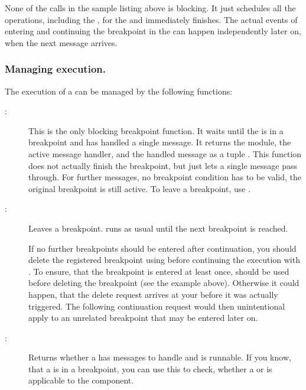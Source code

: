 None of the calls in the sample listing above is blocking. It just schedules
all the operations, including the , for the
 and immediately finishes. The actual events of
entering and continuing the breakpoint in the  can
happen independently later on, when the next  message arrives.

\subsubsection{Managing execution.}

The execution of a  can be managed by the
following functions:

\begin{description}
\item[:] This is the only blocking
  breakpoint function. It waits until the  is in a
  breakpoint and has handled a single message.  It returns the module, the
  active message handler, and the handled message as a tuple .  This function does not actually finish the breakpoint,
  but just lets a single message pass through. For further messages, no
  breakpoint condition has to be valid, the original breakpoint is still
  active. To leave a breakpoint, use .

\item[:]
  Leaves a breakpoint.  runs as usual until the
  next breakpoint is reached.

  If no further breakpoints should be entered after continuation, you should
  delete the registered breakpoint using 
  before continuing the execution with
  . To ensure, that the breakpoint is
  entered at least once,  should be
  used before deleting the breakpoint (see the example above). Otherwise it
  could happen, that the delete request arrives at your
   before it was actually triggered. The following
  continuation request would then unintentional apply to an unrelated
  breakpoint that may be entered later on.

\item[:] Returns whether a
   has messages to handle and is runnable. If you
  know, that a  is in a breakpoint, you can use
  this to check, whether a  or
   is applicable to the component.

\end{description}

